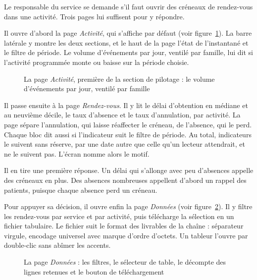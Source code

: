 Le responsable du service se demande s'il faut ouvrir des créneaux de rendez-vous dans une activité.
Trois pages lui suffisent pour y répondre.

Il ouvre d'abord la page \emph{Activité}, qui s'affiche par défaut (voir
figure~\ref{fig:tdb-activite}). La barre latérale y montre les deux sections, et le haut de la page
l'état de l'instantané et le filtre de période. Le volume d'événements par jour, ventilé par
famille, lui dit si l'activité programmée monte ou baisse sur la période choisie.

\begin{figure}[htbp]
\centering
{}
\caption[La page Activité du tableau de bord]{La page \emph{Activité}, première de la section de pilotage : le volume d'événements par jour, ventilé par famille}\label{fig:tdb-activite}
\end{figure}

Il passe ensuite à la page \emph{Rendez-vous}. Il y lit le délai d'obtention en médiane et au
neuvième décile, le taux d'absence et le taux d'annulation, par activité. La page sépare
l'annulation, qui laisse réaffecter le créneau, de l'absence, qui le perd. Chaque bloc dit aussi si
l'indicateur suit le filtre de période. Au total,  indicateurs le
suivent sans réserve,  par une date autre que celle qu'un lecteur
attendrait, et  ne le suivent pas. L'écran nomme alors le motif.

Il en tire une première réponse. Un délai qui s'allonge avec peu d'absences appelle des créneaux en
plus. Des absences nombreuses appellent d'abord un rappel des patients, puisque chaque absence perd
un créneau.

Pour appuyer sa décision, il ouvre enfin la page \emph{Données} (voir figure~\ref{fig:tdb-donnees}).
Il y filtre les rendez-vous par service et par activité, puis télécharge la sélection en un fichier
tabulaire. Le fichier suit le format des livrables de la chaîne : séparateur virgule, encodage
universel avec marque d'ordre d'octets. Un tableur l'ouvre par double-clic sans abîmer les accents.

\begin{figure}[htbp]
\centering
{}
\caption[La page Données du tableau de bord]{La page \emph{Données} : les  filtres, le sélecteur de table, le décompte des lignes retenues et le bouton de téléchargement}\label{fig:tdb-donnees}
\end{figure}

